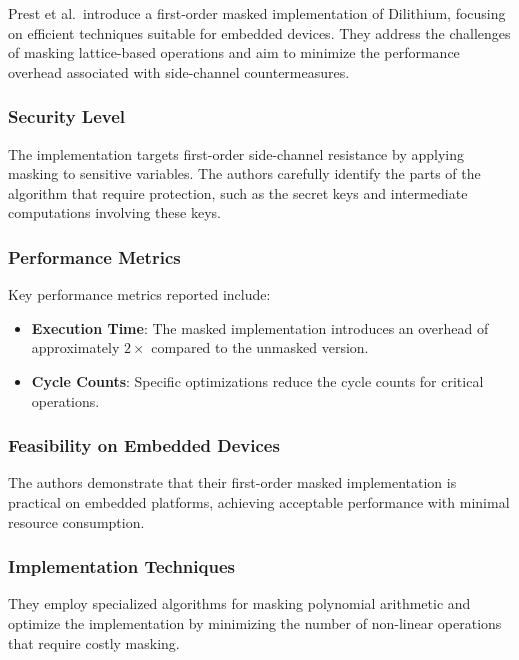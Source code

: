 Prest et al.\ introduce a first-order masked implementation of Dilithium, focusing on efficient techniques suitable for embedded devices. They address the challenges of masking lattice-based operations and aim to minimize the performance overhead associated with side-channel countermeasures.

\subsubsection{Security Level}

The implementation targets first-order side-channel resistance by applying masking to sensitive variables. The authors carefully identify the parts of the algorithm that require protection, such as the secret keys and intermediate computations involving these keys.

\subsubsection{Performance Metrics}

Key performance metrics reported include:

\begin{itemize}
    \item \textbf{Execution Time}: The masked implementation introduces an overhead of approximately $2\times$ compared to the unmasked version.
    \item \textbf{Cycle Counts}: Specific optimizations reduce the cycle counts for critical operations.
\end{itemize}

\subsubsection{Feasibility on Embedded Devices}

The authors demonstrate that their first-order masked implementation is practical on embedded platforms, achieving acceptable performance with minimal resource consumption.

\subsubsection{Implementation Techniques}

They employ specialized algorithms for masking polynomial arithmetic and optimize the implementation by minimizing the number of non-linear operations that require costly masking.

